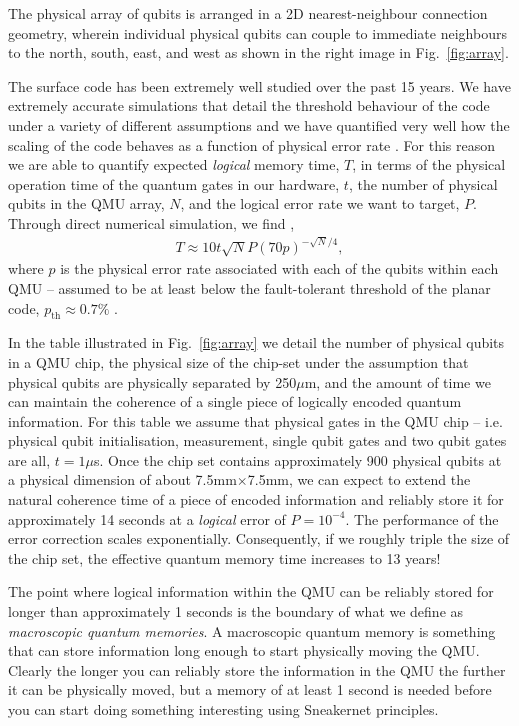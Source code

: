 \documentclass[twocolumn, aps, rmp, amsmath, amssymb, nofootinbib, superscriptaddress, longbibliography, floatfix, table-of-contents, eqsecnum]{revtex4-2}
\begin{document}
The physical array of qubits is arranged in a 2D nearest-neighbour connection geometry, wherein individual physical qubits can couple to immediate neighbours to the north, south, east, and west as shown in the right image in Fig.~\ref{fig:array}. 

The surface code has been extremely well studied over the past 15 years. We have extremely accurate simulations that detail the threshold behaviour of the code under a variety of different assumptions and we have quantified very well how the scaling of the code behaves as a function of physical error rate \cite{SD-Stace:2010aa, SD-Wang:2011aa, SD-Stephens:2014aa, SD-Nagayama:2017aa, SD-Tuckett:2018aa}. For this reason we are able to quantify expected \textit{logical} memory time, $T$, in terms of the physical operation time of the quantum gates in our hardware, $t$, the number of physical qubits in the QMU array, $N$, and the logical error rate we want to target, $P$. Through direct numerical simulation, we find \cite{SD-Devitt:2016aa},
\begin{align} \label{eq:scale}
T \approx 10t\sqrt{N} P(70p)^{-\sqrt{N}/4},
\end{align}
where $p$ is the physical error rate associated with each of the qubits within each QMU -- assumed to be at least below the fault-tolerant threshold of the planar code, $p_\mathrm{th} \approx 0.7\%$ \cite{SD-Fowler:2012aa}.

In the table illustrated in Fig.~\ref{fig:array} we detail the number of physical qubits in a QMU chip, the physical size of the chip-set under the assumption that physical qubits are physically separated by 250$\mu$m, and the amount of time we can maintain the coherence of a single piece of logically encoded quantum information. For this table we assume that physical gates in the QMU chip -- i.e. physical qubit initialisation, measurement, single qubit gates and two qubit gates are all, $t = 1\mu$s. Once the chip set contains approximately 900 physical qubits at a physical dimension of about 7.5mm$\times$7.5mm, we can expect to extend the natural coherence time of a piece of encoded information and reliably store it for approximately 14 seconds at a \textit{logical} error of $P= 10^{-4}$. The performance of the error correction scales exponentially. Consequently, if we roughly triple the size of the chip set, the effective quantum memory time increases to 13 years!

The point where logical information within the QMU can be reliably stored for longer than approximately 1 seconds is the boundary of what we define as \textit{macroscopic quantum memories}. A macroscopic quantum memory is something that can store information long enough to start physically moving the QMU. Clearly the longer you can reliably store the information in the QMU the further it can be physically moved, but a memory of at least 1 second is needed before you can start doing something interesting using Sneakernet principles.
\end{document}
